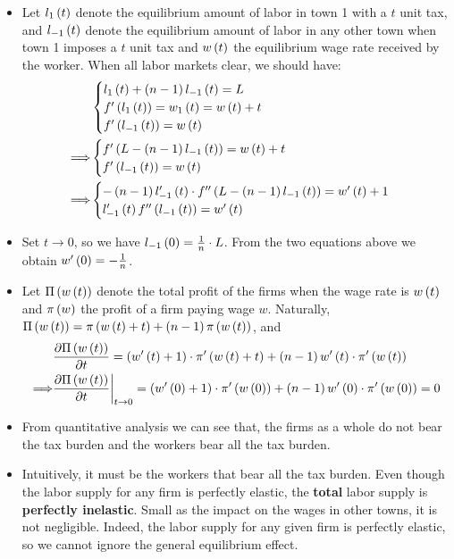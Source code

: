 {\begin{itemize}
  \begin{itemize}
  \item
    Let \(l_1\left(t\right)\) denote the equilibrium amount of labor in town 1
    with a \(t\) unit tax, and \(l_{-1}\left(t\right)\) denote the equilibrium
    amount of labor in any other town when town 1 imposes a \(t\) unit
    tax and \(w\left(t\right)\) the equilibrium wage rate received by the worker.
    When all labor markets clear, we should have:
    \[\begin{aligned}
    & \begin{cases}
    l_1\left(t\right)+\left(n-1\right)l_{-1}\left(t\right)=  L\\
    f'\left(l_1\left(t\right)\right) = w_1\left(t\right) = w\left(t\right)+t\\
    f'\left(l_{-1}\left(t\right)\right) = w\left(t\right)
    \end{cases}\\
    \Longrightarrow & \begin{cases}
    f'\left(L-\left(n-1\right)l_{-1}\left(t\right)\right) = w\left(t\right)+t\\
    f'\left(l_{-1}\left(t\right)\right) = w\left(t\right)
    \end{cases}\\
    \Longrightarrow & \begin{cases}
    -\left(n-1\right)l'_{-1}\left(t\right)\cdot f''\left(L-\left(n-1\right)l_{-1}\left(t\right)\right) = w'\left(t\right)+1\\
    l'_{-1}\left(t\right)f''\left(l_{-1}\left(t\right)\right) = w'\left(t\right)
    \end{cases}
    \end{aligned}\]
  \item
    Set \(t\to 0\), so we have \(l_{-1}\left(0\right) = \frac1n\cdot L\). From
    the two equations above we obtain \(w'\left(0\right) = -\frac1n\).
  \item
    Let \(\Pi\left(w\left(t\right)\right)\) denote the total profit of the firms when the
    wage rate is \(w\left(t\right)\) and \(\pi\left(w\right)\) the profit of a firm paying wage $w$. Naturally,
    \(\Pi\left(w\left(t\right)\right) = \pi\left(w\left(t\right)+t\right)+\left(n-1\right)\pi\left(w\left(t\right)\right)\), and
    \[\begin{aligned}
    & \frac{\partial \Pi\left(w\left(t\right)\right)}{\partial t} = \left(w'\left(t\right)+1\right)\cdot\pi'\left(w\left(t\right)+t\right)+\left(n-1\right)w'\left(t\right)\cdot \pi'\left(w\left(t\right)\right)\\
    \Longrightarrow & \frac{\partial \Pi\left(w\left(t\right)\right)}{\partial t}\bigg|_{t\to 0} = \left(w'\left(0\right)+1\right)\cdot \pi'\left(w\left(0\right)\right)+\left(n-1\right)w'\left(0\right)\cdot \pi'\left(w\left(0\right)\right) = 0
    \end{aligned}\]
  \item
    From quantitative analysis we can see that, the firms as a whole do
    not bear the tax burden and the workers bear all the tax burden.
  \item
    Intuitively, it must be the workers that bear all the tax burden.
    Even though the labor supply for any firm is perfectly elastic, the
    \textbf{total} labor supply is \textbf{perfectly inelastic}. Small as the impact on the wages in other towns, it is not
    negligible. Indeed, the labor supply for any given firm is perfectly
    elastic, so we cannot ignore the general equilibrium effect.
  \end{itemize}
\end{itemize}
}

